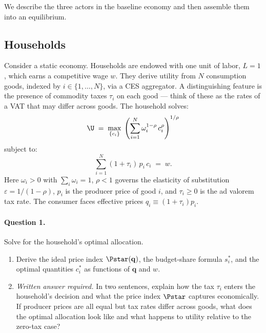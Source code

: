 We describe the three actors in the baseline economy and then assemble them into an equilibrium.
 
\subsection{Households}
\label{subsec:hh-baseline}
 
Consider a static economy. Households are endowed with one unit of labor, $L = 1$, which earns a competitive wage $w$. They derive utility from $N$ consumption goods, indexed by $i \in \{1, \ldots, N\}$, via a CES aggregator. A distinguishing feature is the presence of commodity taxes $\tau_i$ on each good --- think of these as the rates of a VAT that may differ across goods. The household solves:
%
\begin{equation}
    \U \;=\; \max_{\{c_i\}} \; \left( \sum_{i=1}^{N} \omega_i^{1-\rho}\, c_i^{\rho} \right)^{1/\rho}
    \label{eq:hh-baseline}
\end{equation}
%
subject to:
%
\begin{equation}
    \sum_{i=1}^{N} (1+\tau_i)\, p_i\, c_i \;=\; w.
    \label{eq:budget-baseline}
\end{equation}
%
Here $\omega_i > 0$ with $\sum_i \omega_i = 1$, $\rho < 1$ governs the elasticity of substitution $\varepsilon = 1/(1-\rho)$, $p_i$ is the producer price of good $i$, and $\tau_i \geq 0$ is the ad valorem tax rate. The consumer faces effective prices $q_i \equiv (1+\tau_i)p_i$.
 
\paragraph{Question 1.}
Solve for the household's optimal allocation.
 
\begin{enumerate}[label=(\alph*)]
    \item Derive the ideal price index $\Pstar(\mathbf{q})$, the budget-share formula $s_i^*$, and the optimal quantities $c_i^*$ as functions of $\mathbf{q}$ and $w$.
 
    \item \emph{Written answer required.} In two sentences, explain how the tax $\tau_i$ enters the household's decision and what the price index $\Pstar$ captures economically. If producer prices are all equal but tax rates differ across goods, what does the optimal allocation look like and what happens to utility relative to the zero-tax case?
\end{enumerate}
 

